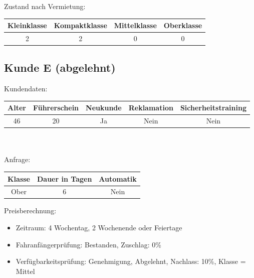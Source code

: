 Zustand nach Vermietung:\\
\begin{tabular}{|c|c|c|c|}
	\hline \textbf{Kleinklasse} & \textbf{Kompaktklasse} & \textbf{Mittelklasse} & \textbf{Oberklasse}  \\ 
	\hline 2 & 2 & 0 & 0 \\ 
	\hline 
\end{tabular}

\subsection{Kunde E (abgelehnt)}

Kundendaten:\\
\begin{tabular}{|c|c|c|c|c|}
	\hline \textbf{Alter} & \textbf{Führerschein} & \textbf{Neukunde} & \textbf{Reklamation} & \textbf{Sicherheitstraining} \\ 
	\hline 46 & 20 & Ja & Nein & Nein \\ 
	\hline 
\end{tabular} 
\\\\
Anfrage:\\
\begin{tabular}{|c|c|c|}
	\hline \textbf{Klasse} & \textbf{Dauer in Tagen} & \textbf{Automatik} \\ 
	\hline Ober & 6 & Nein \\ 
	\hline 
\end{tabular}

Preisberechnung:
\begin{itemize}
	\item Zeitraum: 4 Wochentag, 2 Wochenende oder Feiertage
	\item Fahranfängerprüfung: Bestanden, Zuschlag: 0\%
	\item Verfügbarkeitsprüfung: Genehmigung, Abgelehnt, Nachlass: 10\%, Klasse = Mittel
	
	
\end{itemize}

